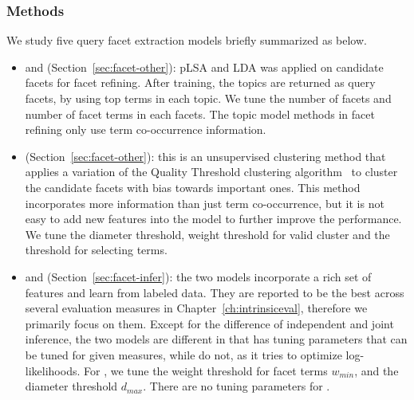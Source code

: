 \subsubsection{Methods}
We study five query facet extraction models briefly summarized as below.
\begin{itemize}
\item \PLSA and \LDA (Section~\ref{sec:facet-other}): pLSA and LDA was applied on candidate facets for facet refining. %
After training, the topics are returned as query facets, by using top terms in each topic. We tune the number of facets and number of facet terms in each facets. The topic model methods in facet refining only use term co-occurrence information.
\item \QDM (Section~\ref{sec:facet-other}): this is an unsupervised clustering method that applies a variation of the Quality Threshold clustering algorithm~\cite{heyer1999exploring} to cluster the candidate facets with bias towards important ones. 
This method incorporates more information than just term co-occurrence, but it is not easy to add new features into the model to further improve the performance.
We tune the diameter threshold, weight threshold for valid cluster and the threshold for selecting terms.
\item \QFI and \QFJ (Section~\ref{sec:facet-infer}): the two models incorporate a rich set of features and learn from labeled data. They are reported to be the best across several evaluation measures in Chapter~\ref{ch:intrinsiceval}, therefore we primarily focus on them. Except for the difference of independent and joint inference, the two models are different in that \QFI has tuning parameters that can be tuned for given measures, while \QFJ do not, as it tries to optimize log-likelihoods. For \QFI, we tune the weight threshold for facet terms $w_{min}$, and the diameter threshold $d_{max}$. There are no tuning parameters for \QFJ.
\end{itemize}

